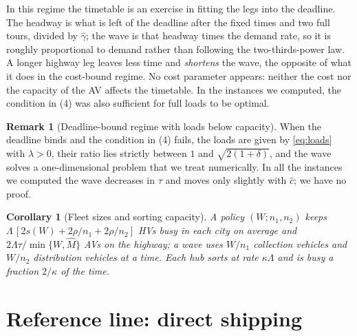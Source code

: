 \documentclass[10pt, reqno]{amsart}
\newtheorem{corollary}[proposition]{Corollary}
\theoremstyle{definition}
\newtheorem{remark}{Remark}
\begin{document}
In this regime the timetable is an exercise in fitting the legs into the deadline. The headway is what is left of the deadline after the fixed times and two full tours, divided by $\hat\gamma$; the wave is that headway times the demand rate, so it is roughly proportional to demand rather than following the two-thirds-power law. A longer highway leg leaves less time and \emph{shortens} the wave, the opposite of what it does in the cost-bound regime. No cost parameter appears: neither the cost nor the capacity of the AV affects the timetable. In the instances we computed, the condition in (4) was also sufficient for full loads to be optimal.

\begin{remark}[Deadline-bound regime with loads below capacity]\label{rem:interior}
When the deadline binds and the condition in (4) fails, the loads are given by \eqref{eq:loads} with $\lambda>0$, their ratio lies strictly between $1$ and $\sqrt{2(1+\delta)}$, and the wave solves a one-dimensional problem that we treat numerically. In all the instances we computed the wave decreases in $\tau$ and moves only slightly with $\hat c$; we have no proof.
\end{remark}

\begin{corollary}[Fleet sizes and sorting capacity]\label{cor:fleet}
A policy $(W;n_1,n_2)$ keeps $\Lambda\,[2s(W)+2\rho/n_1+2\rho/n_2]$ HVs busy in each city on average and $2\Lambda\tau/\min\{W,\hat M\}$ AVs on the highway; a wave uses $W/n_1$ collection vehicles and $W/n_2$ distribution vehicles at a time. Each hub sorts at rate $\kappa\Lambda$ and is busy a fraction $2/\kappa$ of the time.
\end{corollary}

\section{Reference line: direct shipping}\label{sec:bench}
\end{document}
